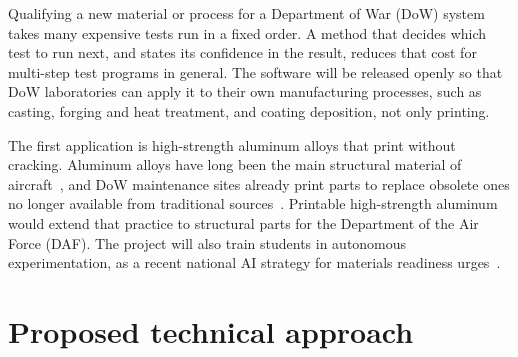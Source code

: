 \documentclass[12pt,letterpaper]{article}
\begin{document}
Qualifying a new material or process for a Department of War (DoW) system
takes many expensive tests run in a fixed order. A method that decides which
test to run next, and states its confidence in the result, reduces that cost
for multi-step test programs in general. The software
will be released openly so that DoW laboratories can apply it to their own
manufacturing processes, such as casting, forging and heat treatment, and
coating deposition, not only printing.

The first application is high-strength aluminum alloys that print without
cracking. Aluminum alloys have long been the main structural material of
aircraft~\cite{dursun2014}, and DoW maintenance sites already print parts to
replace obsolete ones no longer available from traditional
sources~\cite{dodig2019}. Printable high-strength aluminum would extend that
practice to structural parts for the Department of the Air Force (DAF).
The project will also train students in autonomous experimentation, as a recent
national AI strategy for materials readiness urges~\cite{campo2026}.

\section{Proposed technical approach}
\end{document}
